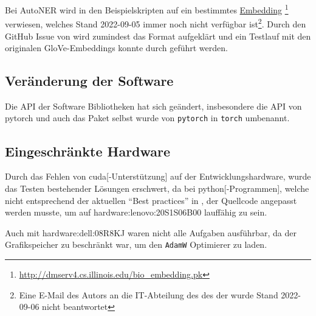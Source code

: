Bei \gls{AutoNER}
wird in den Beispielskripten auf ein bestimmtes
\href{http://dmserv4.cs.illinois.edu/bio_embedding.pk}{Embedding} \footnote{\url{http://dmserv4.cs.illinois.edu/bio_embedding.pk}}
verwiesen,
welches Stand 2022-09-05 immer noch nicht verfügbar ist\footnote{
	Eine E-Mail des Autors an die IT-Abteilung des 
	des 
	der 
	wurde Stand 2022-09-06
	nicht beantwortet}.
Durch den GitHub Issue \autocite{shangjingbo1226:AutoNER:issues:44} von
\citeauthor{shangjingbo1226:AutoNER:issues:44}
wird zumindest das Format aufgeklärt
und ein Testlauf mit den originalen \gls{GloVe}-Embeddings konnte durch geführt werden. \autocite{pennington2014glove}


\subsection{Veränderung der Software}

Die API der Software Bibliotheken hat sich geändert,
insbesondere die API von \gls{pytorch}
und auch das Paket
selbst wurde von \texttt{pytorch} in
\texttt{torch} umbenannt.

\subsection{Eingeschränkte Hardware}
Durch das Fehlen von \gls{cuda}[-Unterstützung]
auf der Entwicklungshardware,
wurde das Testen bestehender Lösungen erschwert,
da bei \gls{python}[-Programmen],
welche nicht entsprechend der aktuellen \enquote{Best practices}
in \autocite[Device-agnostic code]{pytorch:docs:1.12:notes:cuda},
der Quellcode angepasst werden musste,
um auf \gls{hardware:lenovo:20S1S06B00} lauffähig zu sein.

Auch mit \gls{hardware:dell:08R8KJ} waren nicht alle Aufgaben ausführbar,
da der Grafikspeicher zu beschränkt war,
um den \texttt{AdamW} Optimierer zu laden.






